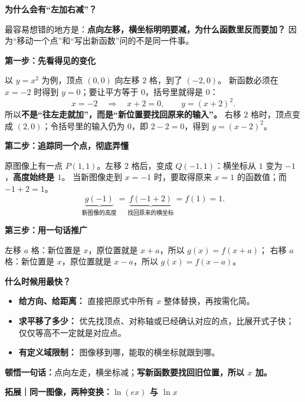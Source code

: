 \begin{explanationbox}
  \textbf{\textcolor{CExplanation}{为什么会有“左加右减”？}}

  最容易想错的地方是：\textbf{点向左移，横坐标明明要减，为什么函数里反而要加？}
  因为“移动一个点”和“写出新函数”问的不是同一件事。

  \medskip
  \textbf{\textcolor{CExplanation}{第一步：先看得见的变化}}

  以 $y=x^2$ 为例，顶点 $(0,0)$ 向左移 $2$ 格，到了 $(-2,0)$。
  新函数必须在 $x=-2$ 时得到 $y=0$；要让平方等于 $0$，括号里就得是 $0$：
  \[
    x=-2\quad\Longrightarrow\quad x+2=0,
    \qquad \boxed{y=(x+2)^2}.
  \]
  所以\textbf{不是“往左走就加”，而是“新位置要找回原来的输入”。}
  右移 $2$ 格时，顶点变成 $(2,0)$；令括号里的输入仍为 $0$，即 $2-2=0$，得到 $y=(x-2)^2$。

  \medskip
  \textbf{\textcolor{CExplanation}{第二步：追踪同一个点，彻底弄懂}}

  原图像上有一点 $P(1,1)$。左移 $2$ 格后，变成 $Q(-1,1)$：横坐标从 $1$ 变为 $-1$，\textbf{高度始终是 $1$}。
  当新图像走到 $x=-1$ 时，要取得原来 $x=1$ 的函数值；而 $-1+2=1$。
  \[
    \underbrace{g(-1)}_{\text{新图像的高度}}
    =\underbrace{f(-1+2)}_{\text{找回原来的横坐标}}
    =f(1)=1.
  \]
  \begin{center}
  
  \end{center}

  \textbf{\textcolor{CExplanation}{第三步：用一句话推广}}

  左移 $a$ 格：新位置是 $x$，原位置就是 $x+a$，所以 $g(x)=f(x+a)$；
  右移 $a$ 格：新位置是 $x$，原位置就是 $x-a$，所以 $g(x)=f(x-a)$。

  \medskip
  \textbf{\textcolor{CExplanation}{什么时候用最快？}}
  \begin{itemize}[leftmargin=*,itemsep=0.35em]
    \item \textbf{给方向、给距离：} 直接把原式中所有 $x$ 整体替换，再按需化简。
    \item \textbf{求平移了多少：} 优先找顶点、对称轴或已经确认对应的点，比展开式子快；仅仅等高不一定就是对应点。
    \item \textbf{有定义域限制：} 图像移到哪，能取的横坐标就跟到哪。
  \end{itemize}

  \textbf{\textcolor{CExplanation}{顿悟一句话：}}点向左走，横坐标减；\textbf{写新函数要找回旧位置，所以 $x$ 加。}

  \medskip
  \textbf{\textcolor{CExplanation}{拓展｜同一图像，两种变换：$\ln(ex)$ 与 $\ln x$}}


\end{explanationbox}
